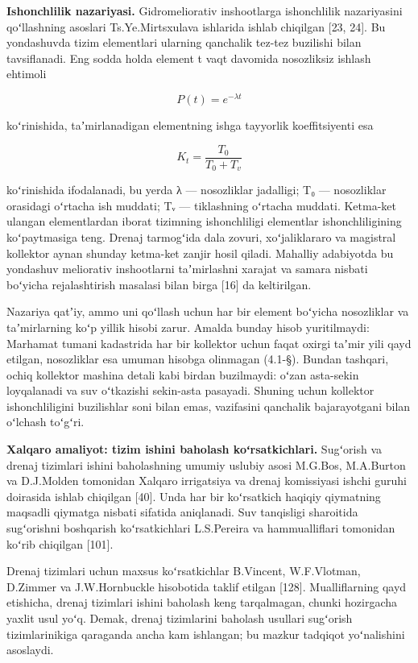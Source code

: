 \documentclass[14pt,a4paper,oneside]{extreport}
\begin{document}
\textbf{Ishonchlilik nazariyasi.} Gidromeliorativ inshootlarga
ishonchlilik nazariyasini qoʻllashning asoslari Ts.Ye.Mirtsxulava
ishlarida ishlab chiqilgan {[}23, 24{]}. Bu yondashuvda tizim
elementlari ularning qanchalik tez-tez buzilishi bilan tavsiflanadi. Eng
sodda holda element t vaqt davomida nosozliksiz ishlash ehtimoli

\begin{equation}\tag{1.1}
P(t) = e^{-\lambda t}
\end{equation}

koʻrinishida, taʼmirlanadigan elementning ishga tayyorlik koeffitsiyenti
esa

\begin{equation}\tag{1.2}
K_t = \frac{T_0}{T_0 + T_v}
\end{equation}

koʻrinishida ifodalanadi, bu yerda λ --- nosozliklar jadalligi; T₀ ---
nosozliklar orasidagi oʻrtacha ish muddati; Tᵥ --- tiklashning oʻrtacha
muddati. Ketma-ket ulangan elementlardan iborat tizimning ishonchliligi
elementlar ishonchliligining koʻpaytmasiga teng. Drenaj tarmogʻida dala
zovuri, xoʻjaliklararo va magistral kollektor aynan shunday ketma-ket
zanjir hosil qiladi. Mahalliy adabiyotda bu yondashuv meliorativ
inshootlarni taʼmirlashni xarajat va samara nisbati boʻyicha
rejalashtirish masalasi bilan birga {[}16{]} da keltirilgan.

Nazariya qatʼiy, ammo uni qoʻllash uchun har bir element boʻyicha
nosozliklar va taʼmirlarning koʻp yillik hisobi zarur. Amalda bunday
hisob yuritilmaydi: Marhamat tumani kadastrida har bir kollektor uchun
faqat oxirgi taʼmir yili qayd etilgan, nosozliklar esa umuman hisobga
olinmagan (4.1-§). Bundan tashqari, ochiq kollektor mashina detali kabi
birdan buzilmaydi: oʻzan asta-sekin loyqalanadi va suv oʻtkazishi
sekin-asta pasayadi. Shuning uchun kollektor ishonchliligini buzilishlar
soni bilan emas, vazifasini qanchalik bajarayotgani bilan oʻlchash
toʻgʻri.

\textbf{Xalqaro amaliyot: tizim ishini baholash koʻrsatkichlari.}
Sugʻorish va drenaj tizimlari ishini baholashning umumiy uslubiy asosi
M.G.Bos, M.A.Burton va D.J.Molden tomonidan Xalqaro irrigatsiya va
drenaj komissiyasi ishchi guruhi doirasida ishlab chiqilgan {[}40{]}.
Unda har bir koʻrsatkich haqiqiy qiymatning maqsadli qiymatga nisbati
sifatida aniqlanadi. Suv tanqisligi sharoitida sugʻorishni boshqarish
koʻrsatkichlari L.S.Pereira va hammualliflari tomonidan koʻrib chiqilgan
{[}101{]}.

Drenaj tizimlari uchun maxsus koʻrsatkichlar B.Vincent, W.F.Vlotman,
D.Zimmer va J.W.Hornbuckle hisobotida taklif etilgan {[}128{]}.
Mualliflarning qayd etishicha, drenaj tizimlari ishini baholash keng
tarqalmagan, chunki hozirgacha yaxlit usul yoʻq. Demak, drenaj
tizimlarini baholash usullari sugʻorish tizimlarinikiga qaraganda ancha
kam ishlangan; bu mazkur tadqiqot yoʻnalishini asoslaydi.
\end{document}
